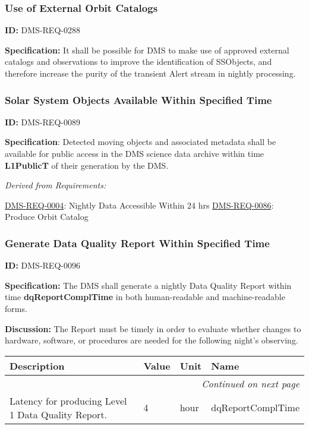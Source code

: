 \documentclass[SE,toc,lsstdraft]{lsstdoc}
\makeatletter
\newcommand{\paramname}[1]{\hspace{0pt}#1}
\newcommand{\unitname}[1]{\hspace{0pt}#1}
\newenvironment{parameters}[0]{%
\setlength\LTleft{0pt}
\setlength\LTright{\fill}
\begin{small}
\begin{longtable}[]{|p{0.5\textwidth}|l|p{0.6in}|p{1.74in}@{}|}

\hline \textbf{Description} & \textbf{Value} & \textbf{Unit} & \textbf{Name} \\ \hline
\endhead

\hline \multicolumn{4}{r}{\emph{Continued on next page}} \\
\endfoot

\hline\hline
\endlastfoot
}{%
\hline
\end{longtable}
\end{small}
}
\makeatother
\begin{document}
\subsubsection{Use of External Orbit Catalogs}

\label{DMS-REQ-0288}
\textbf{ID:} DMS-REQ-0288

\textbf{Specification:} It shall be possible for DMS to make use of approved external catalogs and observations to improve the identification of SSObjects, and therefore increase the purity of the transient Alert stream in nightly processing.






\subsubsection{Solar System Objects Available Within Specified Time}

\label{DMS-REQ-0089}
\textbf{ID:} DMS-REQ-0089

\textbf{Specification}: Detected moving objects and associated metadata shall be available for public access in the DMS science data archive within time \textbf{L1PublicT }of their generation by the DMS.






\emph{Derived from Requirements:}

\hyperref[DMS-REQ-0004]{DMS-REQ-0004}:
Nightly Data Accessible Within 24 hrs \newline
\hyperref[DMS-REQ-0086]{DMS-REQ-0086}:
Produce Orbit Catalog \newline


\subsubsection{Generate Data Quality Report Within Specified Time}

\label{DMS-REQ-0096}
\textbf{ID:} DMS-REQ-0096

\textbf{Specification:} The DMS shall generate a nightly Data Quality Report within time \textbf{dqReportComplTime }in both human-readable and machine-readable forms.

\textbf{Discussion:} The Report must be timely in order to evaluate whether changes to hardware, software, or procedures are needed for the following night's observing.



\begin{parameters}
Latency for producing Level 1 Data Quality Report.
&
4
&
\unitname{%
hour
}
&
\paramname{%
dqReportComplTime
} \\\hline
\end{parameters}
\end{document}
